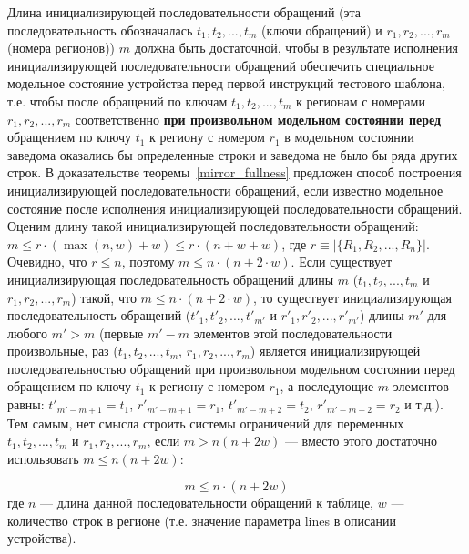 Длина инициализирующей последовательности обращений (эта последовательность обозначалась $t_1, t_2, ..., t_m$ (ключи обращений) и $r_1, r_2, ..., r_m$ (номера регионов)) $m$ должна быть достаточной, чтобы в результате исполнения инициализирующей последовательности обращений обеспечить специальное модельное состояние устройства перед первой инструкций тестового шаблона, т.е. чтобы после обращений по ключам $t_1, t_2, ..., t_m$ к регионам с номерами $r_1, r_2, ..., r_m$ соответственно \textbf{при произвольном модельном состоянии перед} обращением по ключу $t_1$ к региону с номером $r_1$ в модельном состоянии заведома оказались бы определенные строки и заведома не было бы ряда других строк. В доказательстве теоремы~\ref{mirror_fullness} предложен способ построения инициализирующей последовательности обращений, если известно модельное состояние после исполнения инициализирующей последовательности обращений. Оценим длину такой инициализирующей последовательности обращений: $m \leqslant r \cdot (\max(n,w) + w) \leqslant r \cdot (n + w + w)$, где $r \equiv |\{R_1, R_2, ..., R_n\}|$. Очевидно, что $r \leqslant n$, поэтому $m \leqslant n \cdot (n + 2\cdot w)$. Если существует инициализирующая последовательность обращений длины $m$ ($t_1, t_2, ..., t_m$ и $r_1, r_2, ..., r_m$) такой, что $m \leqslant n \cdot (n + 2\cdot w)$, то существует инициализирующая последовательность обращений ($t'_1, t'_2, ..., t'_{m'}$ и $r'_1, r'_2, ..., r'_{m'}$) длины $m'$ для любого $m' > m$ (первые $m'-m$ элементов этой последовательности произвольные, раз ($t_1, t_2, ..., t_m$, $r_1, r_2, ..., r_m$) является инициализирующей последовательностью обращений при произвольном модельном состоянии перед обращением по ключу $t_1$ к региону с номером $r_1$, а последующие $m$ элементов равны: $t'_{m'-m+1}=t_1$, $r'_{m'-m+1} = r_1$, $t'_{m'-m+2} = t_2$, $r'_{m'-m+2} = r_2$ и т.д.). Тем самым, нет смысла строить системы ограничений для переменных $t_1, t_2, ..., t_m$ и $r_1, r_2, ..., r_m$, если $m > n(n+2w)$ --- вместо этого достаточно использовать $m \leqslant n(n+2w)$:
\begin{utv} $$m \leqslant n\cdot(n + 2w)$$ где $n$ --- длина данной последовательности обращений к таблице, $w$ --- количество строк в регионе (т.е. значение параметра lines в описании устройства).\end{utv}


